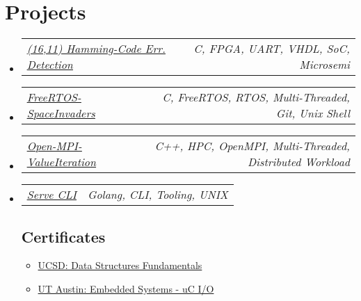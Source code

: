 \documentclass[letterpaper,11pt]{article}
\makeatletter
\newcommand{\resumeItem}[1]{
  \item\small{
    {#1 \vspace{-2pt}}
  }
}
\newcommand{\resumeProjectHeading}[2]{
    \item
    \begin{tabular*}{0.97\textwidth}{l@{\extracolsep{\fill}}r}
      \small#1 & #2 \\
    \end{tabular*}\vspace{-7pt}
}
\newcommand{\resumeSubHeadingListStart}{\begin{itemize}[leftmargin=0.15in, label={}]}
\newcommand{\resumeSubHeadingListEnd}{\end{itemize}}
\newcommand{\resumeItemListStart}{\begin{itemize}}
\newcommand{\resumeItemListEnd}{\end{itemize}\vspace{-5pt}}
\makeatother
\begin{document}
\section{Projects}
    \resumeSubHeadingListStart
        \resumeProjectHeading
        { \href{https://github.com/duclos-cavalcanti/microsemi-error-detection}{\underline{\textit{(16,11) Hamming-Code Err. Detection}} } }{\footnotesize\emph{C, FPGA, UART, VHDL, SoC, Microsemi}}
        \vspace{-9.0pt}
        \resumeProjectHeading
        { \href{https://github.com/duclos-cavalcanti/FreeRTOS-SpaceInvaders}{\underline{\textit{FreeRTOS-SpaceInvaders}}} }{\footnotesize\emph{C, FreeRTOS, RTOS, Multi-Threaded, Git, Unix Shell}}
        \vspace{-9.0pt}
        \resumeProjectHeading
        { \href{https://github.com/duclos-cavalcanti/Open-MPI-ValueIteration}{\underline{\textit{Open-MPI-ValueIteration}}} }{\footnotesize\emph{C++, HPC, OpenMPI, Multi-Threaded, Distributed Workload}}
        \vspace{-9.0pt}
        \resumeProjectHeading
        { \href{https://github.com/duclos-cavalcanti/serve}{\underline{\textit{Serve CLI}}} }{\footnotesize\emph{Golang, CLI, Tooling, UNIX}}

        \subsection{Certificates}

        \begin{minipage}{0.45\textwidth}
            \resumeItemListStart
                \resumeItem{\small{\href{https://courses.edx.org/certificates/f9250573933e4a3e87e8b28ea989bf99}{{UCSD: Data Structures Fundamentals}}}}
            \resumeItemListEnd
        \end{minipage}%
        \hfill %
        \begin{minipage}{0.45\textwidth}
            \begin{itemize}
                \resumeItem{\small{\href{https://courses.edx.org/certificates/af6115bce0c646aa95f6aaa6c98acb09}{{UT Austin: Embedded Systems - uC I/O}}}}
            \resumeItemListEnd
        \end{minipage}

    \resumeSubHeadingListEnd
    
\end{document}
